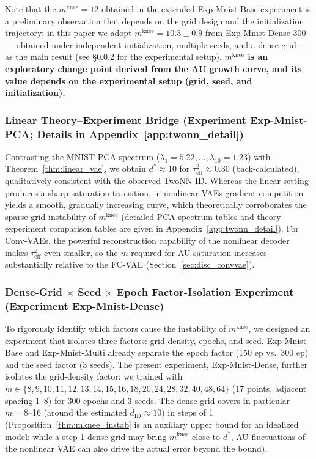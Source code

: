 \documentclass[make,article,submit,pdftex,moreauthors]{Definitions/mdpi}
\newcommand{\mknee}{m^{\mathrm{knee}}}
\begin{document}
Note that the $\mknee = 12$ obtained in the extended Exp-Mnist-Base experiment is a
preliminary observation that depends on the grid design and the initialization trajectory;
in this paper we adopt $\mknee = 10.3 \pm 0.9$ from Exp-Mnist-Dense-300 --- obtained under
independent initialization, multiple seeds, and a dense grid --- as the main result
(see \S\ref{sec:exp_el} for the experimental setup).
\textbf{$\mknee$ is an exploratory change point derived from the AU growth curve, and its
value depends on the experimental setup (grid, seed, and initialization).}

\subsubsection{Linear Theory--Experiment Bridge (Experiment Exp-Mnist-PCA; Details in Appendix~\ref{app:twonn_detail})}\label{sec:exp_em}

Contrasting the MNIST PCA spectrum ($\lambda_1=5.22, \ldots, \lambda_{10}=1.23$) with
Theorem~\ref{thm:linear_vae}, we obtain $d^* \approx 10$ for
$\tau^2_\mathrm{eff} \approx 0.30$ (back-calculated), qualitatively consistent with the
observed TwoNN ID.
Whereas the linear setting produces a sharp saturation transition, in nonlinear VAEs gradient
competition yields a smooth, gradually increasing curve, which theoretically corroborates the
sparse-grid instability of $\mknee$ (detailed PCA spectrum tables and theory--experiment
comparison tables are given in Appendix~\ref{app:twonn_detail}).
For Conv-VAEs, the powerful reconstruction capability of the nonlinear decoder makes
$\tau^2_\mathrm{eff}$ even smaller, so the $m$ required for AU saturation increases
substantially relative to the FC-VAE (Section~\ref{sec:disc_convvae}).

\subsubsection{Dense-Grid $\times$ Seed $\times$ Epoch Factor-Isolation Experiment (Experiment Exp-Mnist-Dense)}\label{sec:exp_el}

To rigorously identify which factors cause the instability of $\mknee$, we designed an
experiment that isolates three factors: grid density, epochs, and seed.
Exp-Mnist-Base and Exp-Mnist-Multi already separate the epoch factor (150 ep vs.\ 300 ep) and
the seed factor (3 seeds).
The present experiment, Exp-Mnist-Dense, further isolates the grid-density factor: we trained
with $m \in \{8,9,10,11,12,13,14,15,16,18,20,24,28,32,40,48,64\}$
(17 points, adjacent spacing 1--8) for 300 epochs and 3 seeds.
The dense grid covers in particular $m = 8$--16 (around the estimated
$\hat{d}_\mathrm{ID} \approx 10$) in steps of 1
(Proposition~\ref{thm:mknee_instab} is an auxiliary upper bound for an idealized model; while
a step-1 dense grid may bring $\mknee$ close to $d^*$, AU fluctuations of the nonlinear VAE
can also drive the actual error beyond the bound).
\end{document}
